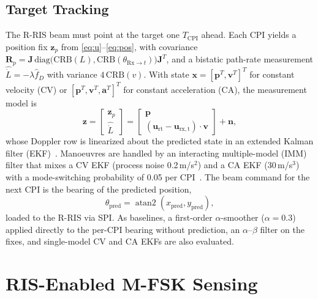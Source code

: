 \documentclass[journal]{IEEEtran}
\newcommand{\Rris}{R-RIS}
\begin{document}
\subsection{Target Tracking}
The \Rris{} beam must point at the target one $T_{\mathrm{CPI}}$ ahead. Each CPI yields a position fix $\bm{z}_p$ from \eqref{eq:u}--\eqref{eq:pos}, with covariance $\bm{R}_p = \bm{J}\,\mathrm{diag}\big(\mathrm{CRB}(L),\mathrm{CRB}(\theta_{\mathrm{Rx}\to t})\big)\bm{J}^T$, and a bistatic path-rate measurement $\hat{\dot L} = -\lambda\hat f_D$ with variance $4\,\mathrm{CRB}(v)$. With state $\bm{x} = [\bm{p}^T, \bm{v}^T]^T$ for constant velocity (CV) or $[\bm{p}^T,\bm{v}^T,\bm{a}^T]^T$ for constant acceleration (CA), the measurement model is
\begin{equation}
\bm{z} = \begin{bmatrix}\bm{z}_p\\ \hat{\dot L}\end{bmatrix}
= \begin{bmatrix}\bm{p}\\ (\bm{u}_{\mathrm{rt}}-\bm{u}_{\mathrm{rx,t}})\cdot\bm{v}\end{bmatrix} + \bm{n},
\label{eq:meas}
\end{equation}
whose Doppler row is linearized about the predicted state in an extended Kalman filter (EKF)~\cite{bar2001estimation}. Manoeuvres are handled by an interacting multiple-model (IMM) filter that mixes a CV EKF (process noise 0.2\,m/s$^2$) and a CA EKF (30\,m/s$^3$) with a mode-switching probability of 0.05 per CPI~\cite{bar2001estimation,blackman1999design}. The beam command for the next CPI is the bearing of the predicted position,
\begin{equation}
\theta_{\mathrm{pred}} = \operatorname{atan2}(x_{\mathrm{pred}}, y_{\mathrm{pred}}),
\label{eq:theta_pred}
\end{equation}
loaded to the \Rris{} via SPI. As baselines, a first-order $\alpha$-smoother ($\alpha = 0.3$) applied directly to the per-CPI bearing without prediction, an $\alpha$--$\beta$ filter on the fixes, and single-model CV and CA EKFs are also evaluated.

\section{RIS-Enabled M-FSK Sensing}
\label{sec:results}
\end{document}
